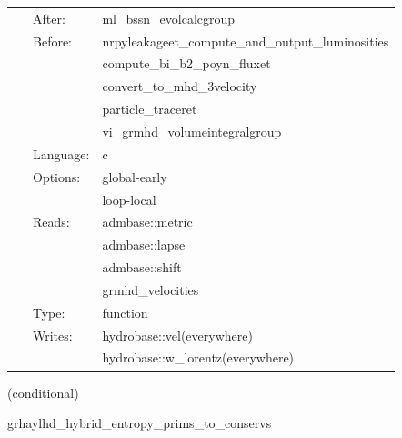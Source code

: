 \documentclass{article}
\begin{document}
 \begin{tabular*}{160mm}{cll} 
~ & After:  & ml\_bssn\_evolcalcgroup \\ 
~ & Before:  & nrpyleakageet\_compute\_and\_output\_luminosities \\ 
~& ~ &compute\_bi\_b2\_poyn\_fluxet\\ 
~& ~ &convert\_to\_mhd\_3velocity\\ 
~& ~ &particle\_traceret\\ 
~& ~ &vi\_grmhd\_volumeintegralgroup\\ 
~ & Language:  & c \\ 
~ & Options:  & global-early \\ 
~& ~ &loop-local\\ 
~ & Reads:  & admbase::metric \\ 
~& ~ &admbase::lapse\\ 
~& ~ &admbase::shift\\ 
~& ~ &grmhd\_velocities\\ 
~ & Type:  & function \\ 
~ & Writes:  & hydrobase::vel(everywhere) \\ 
~& ~ &hydrobase::w\_lorentz(everywhere)\\ 
\end{tabular*} 


\vspace{5mm}

   (conditional) 

\hspace{5mm} grhaylhd\_hybrid\_entropy\_prims\_to\_conservs 

\hspace{5mm}{\it entropy+hybrid version of grhaylhd\_prims\_to\_conservs } 


\hspace{5mm}
\end{document}
